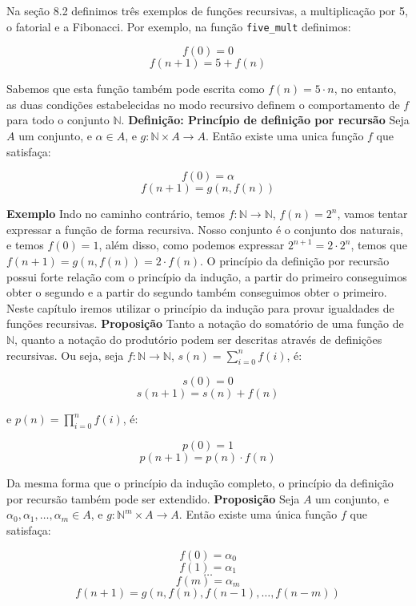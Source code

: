 Na seção 8.2 definimos três exemplos de funções recursivas, a multiplicação por 5, o fatorial e a Fibonacci.
Por exemplo, na função \lstinline{five_mult} definimos:
\begin{center}
    \[ f(0) = 0 \] 
    \[ f(n+1) = 5 + f(n) \]
\end{center}
Sabemos que esta função também pode escrita como $f(n) = 5\cdot n$, no entanto, as duas condições estabelecidas
no modo recursivo definem o comportamento de $f$ para todo o conjunto $\mathbb{N}$.
\newline \textbf{Definição: Princípio de definição por recursão} Seja $A$ um conjunto, e $\alpha \in A$,
e $g : \mathbb{N} \times A \to A$. Então existe uma unica função $f$ que satisfaça:
\begin{center}
    \[ f(0) = \alpha \]
    \[ f(n+1) = g(n, f(n))\]
\end{center} 
\textbf{Exemplo} Indo no caminho contrário, temos $f : \mathbb{N} \to \mathbb{N}$, $f(n) = 2^n$, vamos
tentar expressar a função de forma recursiva. Nosso conjunto é o conjunto dos naturais, e temos $f(0) = 1$,
além disso, como podemos expressar $2^{n+1} = 2\cdot 2^{n}$, temos que $f(n+1) = g(n, f(n)) = 2\cdot f(n)$.
\newline O princípio da definição por recursão possui forte relação com o princípio da indução, a partir do
primeiro conseguimos obter o segundo e a partir do segundo também conseguimos obter o primeiro. Neste capítulo
iremos utilizar o princípio da indução para provar igualdades de funções recursivas. 
\newline \textbf{Proposição} Tanto a notação do somatório de uma função de $\mathbb{N}$, quanto a notação
do produtório podem ser descritas através de definições recursivas. Ou seja, seja $f : \mathbb{N} \to 
\mathbb{N}$, $s(n) = \sum_{i=0}^{n} f(i)$, é:
\begin{center}
    \[ s(0) = 0\]
    \[s(n+1)=s(n)+f(n)\]
\end{center}
e $p(n) = \prod_{i=0}^n f(i)$, é:
\begin{center}
    \[ p(0) = 1\]
    \[ p(n+1)=p(n)\cdot f(n)\]
\end{center}
Da mesma forma que o princípio da indução completo, o princípio da definição por recursão também pode ser
extendido.
\newline \textbf{Proposição} Seja $A$ um conjunto, e $\alpha_0, \alpha_1, \dots, \alpha_m \in A$,
e $g : \mathbb{N}^m \times A \to A$. Então existe uma única função $f$ que satisfaça:
\begin{center}
    \[ f(0) = \alpha_0 \]
    \[ f(1) = \alpha_1 \]
    \[ \dots \]
    \[ f(m) = \alpha_m \]
    \[ f(n+1) = g(n, f(n), f(n-1), \dots, f(n-m))\]
\end{center} 
